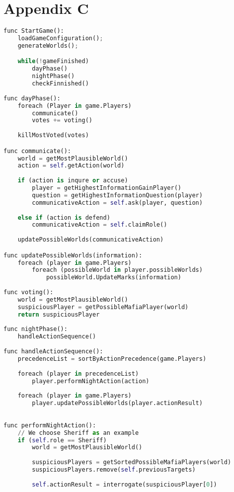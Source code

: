 \section{Appendix C}
\begin{lstlisting}[language=Python]
func StartGame():
	loadGameConfiguration();
	generateWorlds();

	while(!gameFinished)
		dayPhase()
		nightPhase()
		checkFinnished()
	
func dayPhase():
	foreach (Player in game.Players)
		communicate()
		votes += voting()
	
	killMostVoted(votes)

func communicate():
	world = getMostPlausibleWorld()
	action = self.getAction(world)
	
	if (action is inqure or accuse)
		player = getHighestInformationGainPlayer()
		question = getHighestInformationQuestion(player)
		communicativeAction = self.ask(player, question)
	
	else if (action is defend)
		communicativeAction = self.claimRole()
	
	updatePossibleWorlds(communicativeAction)

func updatePossibleWorlds(information):
    foreach (player in game.Players)
    	foreach (possibleWorld in player.possibleWorlds)
			possibleWorld.UpdateMarks(information)
	
func voting():
	world = getMostPlausibleWorld()
	suspiciousPlayer = getPossibleMafiaPlayer(world)
	return suspiciousPlayer
	
func nightPhase():
	handleActionSequence()
	
func handleActionSequence():
	precedenceList = sortByActionPrecedence(game.Players)
	
	foreach (player in precedenceList)
		player.performNightAction(action)
	
	foreach (player in game.Players)
		player.updatePossibleWorlds(player.actionResult)
	
	
func performNightAction():
	// We choose Sheriff as an example
	if (self.role == Sheriff)
		world = getMostPlausibleWorld()
	
		suspiciousPlayers = getSortedPossibleMafiaPlayers(world)
		suspiciousPlayers.remove(self.previousTargets)
	
		self.actionResult = interrogate(suspiciousPlayer[0])
\end{lstlisting}